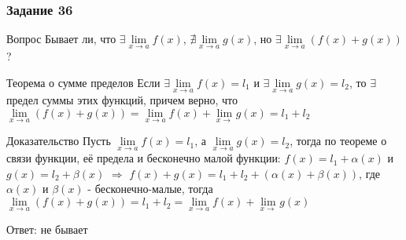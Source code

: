 \documentclass[8pt]{beamer}
\begin{document}
  \begin{frame}
    \frametitle{Задание 36}

    \begin{block}{Вопрос}
      Бывает ли, что $\exists \lim\limits_{x \rightarrow a}f(x)$, $\nexists \lim\limits_{x \rightarrow a}g(x)$,
      но $\exists \lim\limits_{x \rightarrow a}(f(x) + g(x))$?
    \end{block} \pause

    \begin{alertblock}{Теорема о сумме пределов}
      Если $\exists \lim\limits_{x \rightarrow a}f(x) = l_1$ и $\exists \lim\limits_{x \rightarrow a}g(x) = l_2$,
      то $\exists$ предел суммы этих функций, причем верно, что
      $\lim\limits_{x \rightarrow a}(f(x) + g(x)) = \lim\limits_{x \rightarrow a}f(x) + \lim\limits_{x \rightarrow}g(x) = l_1 + l_2$
    \end{alertblock} \pause

    \begin{exampleblock}{Доказательство}
      Пусть $\lim\limits_{x \rightarrow a}f(x) = l_1$, а 
      $\lim\limits_{x \rightarrow a}g(x) = l_2$, тогда по теореме
      о связи функции, её предела и бесконечно малой функции:
      $f(x) = l_1 + \alpha (x)$ и $g(x) = l_2 + \beta (x)$ $\Rightarrow$
      $f(x) + g(x) = l_1 + l_2 + (\alpha (x) + \beta (x))$, где $\alpha (x)$ и $\beta (x)$
      - бесконечно-малые,
      тогда $\lim\limits_{x \rightarrow a}(f(x) + g(x)) = l_1 + l_2 = \lim\limits_{x \rightarrow a}f(x) + \lim\limits_{x \rightarrow}g(x)$
    \end{exampleblock} \pause


    \begin{flushright}
      Ответ: не бывает
    \end{flushright}
  \end{frame}
\end{document}

